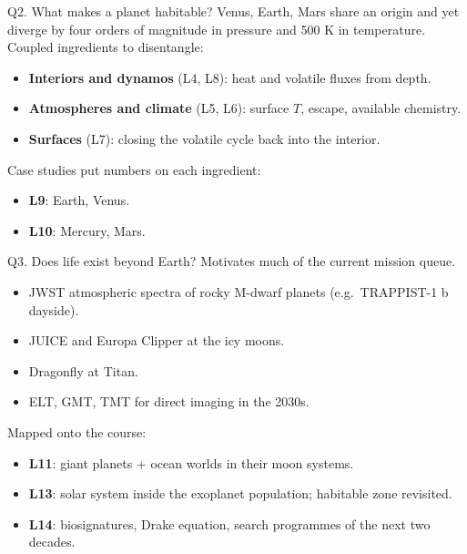 \documentclass[aspectratio=169, 11pt]{beamer}
\begin{document}
\begin{frame}{Q2. What makes a planet habitable?}
  Venus, Earth, Mars share an origin and yet diverge by four orders of magnitude in pressure and 500 K in temperature.
  \vskip6pt\relax
  Coupled ingredients to disentangle:
  \begin{itemize}
    \item \textbf{Interiors and dynamos} (L4, L8): heat and volatile fluxes from depth.
    \item \textbf{Atmospheres and climate} (L5, L6): surface $T$, escape, available chemistry.
    \item \textbf{Surfaces} (L7): closing the volatile cycle back into the interior.
  \end{itemize}
  \vskip4pt\relax
  Case studies put numbers on each ingredient:
  \begin{itemize}
    \item \textbf{L9}: Earth, Venus.
    \item \textbf{L10}: Mercury, Mars.
  \end{itemize}
\end{frame}

\begin{frame}{Q3. Does life exist beyond Earth?}
  Motivates much of the current mission queue.
  \vskip4pt\relax
  \begin{itemize}
    \item JWST atmospheric spectra of rocky M-dwarf planets (e.g.\ TRAPPIST-1 b dayside).
    \item JUICE and Europa Clipper at the icy moons.
    \item Dragonfly at Titan.
    \item ELT, GMT, TMT for direct imaging in the 2030s.
  \end{itemize}
  \vskip4pt\relax
  Mapped onto the course:
  \begin{itemize}
    \item \textbf{L11}: giant planets + ocean worlds in their moon systems.
    \item \textbf{L13}: solar system inside the exoplanet population; habitable zone revisited.
    \item \textbf{L14}: biosignatures, Drake equation, search programmes of the next two decades.
  \end{itemize}
\end{frame}
\end{document}

